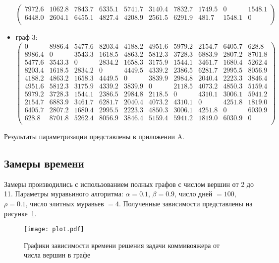 \begin{itemize}
$$\begin{pmatrix}
		7972.6 & 1062.8 & 7843.7 & 6335.1 & 5741.7 & 3140.4 & 7832.7 & 1749.5 & 0 & 1548.1\\
		6448.0 & 2604.1 & 6455.1 & 4827.4 & 4208.9 & 2561.5 & 6291.9 & 481.7 & 1548.1 & 0\\
	\end{pmatrix}
	$$
	\item граф 3:
	$$
	\begin{pmatrix}
		0 & 8986.4 & 5477.6 & 8203.4 & 4188.2 & 4951.6 & 5979.2 & 2154.7 & 6405.7 & 628.8\\
		8986.4 & 0 & 3543.3 & 1618.5 & 4863.2 & 5812.3 & 3728.3 & 6883.9 & 2807.2 & 8701.8\\
		5477.6 & 3543.3 & 0 & 2834.2 & 1658.3 & 3175.9 & 1544.1 & 3461.7 & 1680.4 & 5262.4\\
		8203.4 & 1618.5 & 2834.2 & 0 & 4449.5 & 4339.2 & 2386.5 & 6281.7 & 2995.5 & 8056.9\\
		4188.2 & 4863.2 & 1658.3 & 4449.5 & 0 & 3839.9 & 2984.8 & 2040.4 & 2223.3 & 3846.4\\
		4951.6 & 5812.3 & 3175.9 & 4339.2 & 3839.9 & 0 & 2118.5 & 4073.2 & 4850.3 & 5159.4\\
		5979.2 & 3728.3 & 1544.1 & 2386.5 & 2984.8 & 2118.5 & 0 & 4310.1 & 3006.1 & 5941.2\\
		2154.7 & 6883.9 & 3461.7 & 6281.7 & 2040.4 & 4073.2 & 4310.1 & 0 & 4251.8 & 1819.0\\
		6405.7 & 2807.2 & 1680.4 & 2995.5 & 2223.3 & 4850.3 & 3006.1 & 4251.8 & 0 & 6030.9\\
		628.8 & 8701.8 & 5262.4 & 8056.9 & 3846.4 & 5159.4 & 5941.2 & 1819.0 & 6030.9 & 0\\
	\end{pmatrix}
	$$
\end{itemize}

Результаты параметризации представлены в приложении A.

\subsection{Замеры времени}

Замеры производились с использованием полных графов с числом вершин от 2 до 11. Параметры муравьиного алгоритма: $\alpha=0.1$, $\beta = 0.9$, число дней $= 100$, $\rho=0.1$, число элитных муравьев $= 4$. Полученные зависимости представлены на рисунке~\ref{fig:plot}.
\begin{figure}[H]
	\centering
	\texttt{[image: plot.pdf]}
	\caption{Графики зависимости времени решения задачи коммивояжера от числа вершин в графе}
	\label{fig:plot}
\end{figure}

